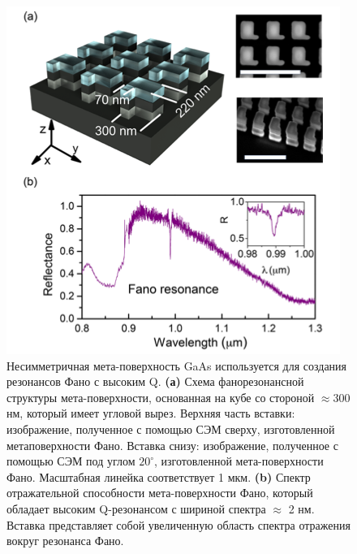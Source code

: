 \begin{figure}[h!]
    \centering
	\includegraphics[width=0.5\linewidth]{images/fig6.png}
	\caption{Несимметричная мета-поверхность GaAs используется для создания резонансов Фано с высоким Q. \textbf{(а) }Схема фанорезонансной структуры мета-поверхности, основанная на кубе со стороной $\approx 300$ нм, который имеет угловой вырез. Верхняя часть вставки: изображение, полученное с помощью СЭМ сверху, изготовленной метаповерхности Фано. Вставка снизу: изображение, полученное с помощью СЭМ под углом $20^\circ$, изготовленной мета-поверхности Фано. Масштабная линейка соответствует 1 мкм. \textbf{(b)} Спектр отражательной способности мета-поверхности Фано, который обладает высоким Q-резонансом с шириной спектра $\approx$ 2 нм. Вставка представляет собой увеличенную область спектра отражения вокруг резонанса Фано. }
	\label{nonliner:matasurf}
\end{figure}

